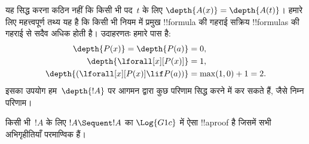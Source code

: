 \documentclass[../../../include/open-logic-section]{subfiles}
\begin{document}
यह सिद्ध करना कठिन नहीं कि किसी भी पद~$t$ के लिए $\depth{A(x)} =
\depth{A(t)}$। हमारे लिए महत्त्वपूर्ण तथ्य यह है कि किसी भी नियम में प्रमुख
!!{formula} की गहराई सक्रिय !!{formula}s की गहराई से सदैव अधिक होती है।
उदाहरणतः हमारे पास है:
\begin{align*}
\depth{P(x)} = \depth{P(a)} & = 0,\\
\depth{\lforall[x][P(x)]} & = 1,\\
\depth{(\lforall[x][P(x)] \lif P(a))} & = \max(1,0) + 1 = 2.
\end{align*}
इसका उपयोग हम~$\depth{!A}$ पर आगमन द्वारा कुछ परिणाम सिद्ध करने में कर सकते
हैं, जैसे निम्न परिणाम।

\begin{prop}
किसी भी~$!A$ के लिए $!A \Sequent !A$ का $\Log{G1c}$ में ऐसा !!a{proof} है
जिसमें सभी अभिगृहीतियाँ परमाण्विक हैं।
\end{prop}
\end{document}

